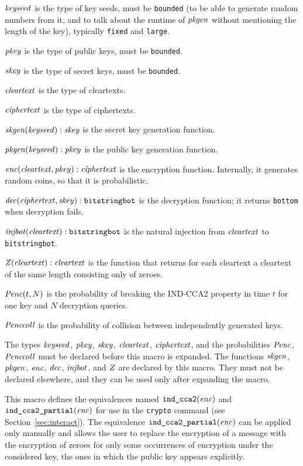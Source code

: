 \documentclass{article}
\begin{document}
\begin{itemize}
  $\mathit{keyseed}$ is the type of key seeds, must be \texttt{bounded}
  (to be able to generate random numbers from it, and to talk about
  the runtime of $\mathit{pkgen}$ without mentioning the length of the key),
  typically \texttt{fixed} and \texttt{large}.

   $\mathit{pkey}$ is the type of public keys, must be \texttt{bounded}.

   $\mathit{skey}$ is the type of secret keys, must be \texttt{bounded}.

   $\mathit{cleartext}$ is the type of cleartexts.

   $\mathit{ciphertext}$ is the type of ciphertexts.

   $\mathit{skgen}(\mathit{keyseed}): \mathit{skey}$ is the secret key generation function.

   $\mathit{pkgen}(\mathit{keyseed}): \mathit{pkey}$ is the public key generation function.

   $\mathit{enc}(\mathit{cleartext}, \mathit{pkey}): \mathit{ciphertext}$ is the encryption function. Internally, it generates random coins, so that it is probabilistic.

   $\mathit{dec}(\mathit{ciphertext}, \mathit{skey}): \texttt{bitstringbot}$ is the
  decryption function; it returns \texttt{bottom} when decryption
  fails.

   $\mathit{injbot}(\mathit{cleartext}): \texttt{bitstringbot}$ is the natural
  injection from $\mathit{cleartext}$ to \texttt{bitstringbot}.

   $\mathit{Z}(\mathit{cleartext}): \mathit{cleartext}$ is the function that
  returns for each cleartext a cleartext of the same length consisting
  only of zeroes.

   $\mathit{Penc}(t, N)$ is the probability of breaking the IND-CCA2 property
   in time $t$ for one key and $N$ decryption queries.

   $\mathit{Penccoll}$ is the probability of collision between independently generated keys.

   The types $\mathit{keyseed}$, $\mathit{pkey}$, $\mathit{skey}$,
   $\mathit{cleartext}$, $\mathit{ciphertext}$, and the
   probabilities $\mathit{Penc}$, $\mathit{Penccoll}$ must be declared before
   this macro is expanded. The functions $\mathit{skgen}$, $\mathit{pkgen}$,
   $\mathit{enc}$, $\mathit{dec}$, $\mathit{injbot}$, and $\mathit{Z}$ are declared by
   this macro. They must not be declared elsewhere, and they can be
   used only after expanding the macro.

   This macro defines the equivalences named $\texttt{ind\_cca2}(\mathit{enc})$
   and $\texttt{ind\_cca2\_partial}(\mathit{enc})$
   for use in the \texttt{crypto} command 
   (see Section~\ref{sec:interact}). The equivalence $\texttt{ind\_cca2\_partial}(\mathit{enc})$
   can be applied only manually and allows the user to replace the encryption 
   of a message with the encryption of zeroes for only some occurrences of
   encryption under the considered key, the ones in which the public key appears explicitly.


\end{itemize}
\end{document}
